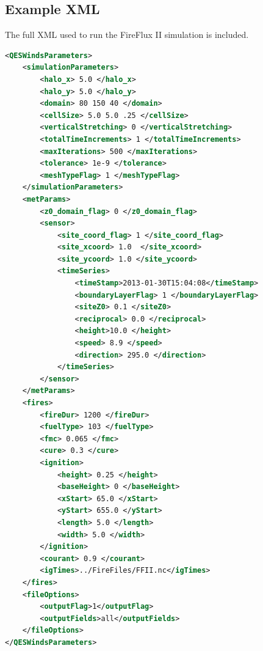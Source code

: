 \subsection{Example XML}
The full XML used to run the FireFlux II simulation is included.
\begin{lstlisting}[language=XML]
<QESWindsParameters>
    <simulationParameters>
        <halo_x> 5.0 </halo_x>
        <halo_y> 5.0 </halo_y>
        <domain> 80 150 40 </domain>
        <cellSize> 5.0 5.0 .25 </cellSize>
        <verticalStretching> 0 </verticalStretching>
        <totalTimeIncrements> 1 </totalTimeIncrements>
        <maxIterations> 500 </maxIterations>
        <tolerance> 1e-9 </tolerance>
        <meshTypeFlag> 1 </meshTypeFlag>
    </simulationParameters>
    <metParams>
        <z0_domain_flag> 0 </z0_domain_flag>
        <sensor>
            <site_coord_flag> 1 </site_coord_flag>
            <site_xcoord> 1.0  </site_xcoord>
            <site_ycoord> 1.0 </site_ycoord>
            <timeSeries>
                <timeStamp>2013-01-30T15:04:08</timeStamp>
                <boundaryLayerFlag> 1 </boundaryLayerFlag>
                <siteZ0> 0.1 </siteZ0>
                <reciprocal> 0.0 </reciprocal>
                <height>10.0 </height>
                <speed> 8.9 </speed>
                <direction> 295.0 </direction>
            </timeSeries>
        </sensor>
    </metParams>
    <fires>
        <fireDur> 1200 </fireDur>
        <fuelType> 103 </fuelType>
        <fmc> 0.065 </fmc>
        <cure> 0.3 </cure>
        <ignition>
            <height> 0.25 </height>
            <baseHeight> 0 </baseHeight>
            <xStart> 65.0 </xStart>
            <yStart> 655.0 </yStart>
            <length> 5.0 </length>
            <width> 5.0 </width>
        </ignition>
        <courant> 0.9 </courant>
        <igTimes>../FireFiles/FFII.nc</igTimes>
    </fires>
    <fileOptions>
        <outputFlag>1</outputFlag>
        <outputFields>all</outputFields>
    </fileOptions>
</QESWindsParameters>
\end{lstlisting}

